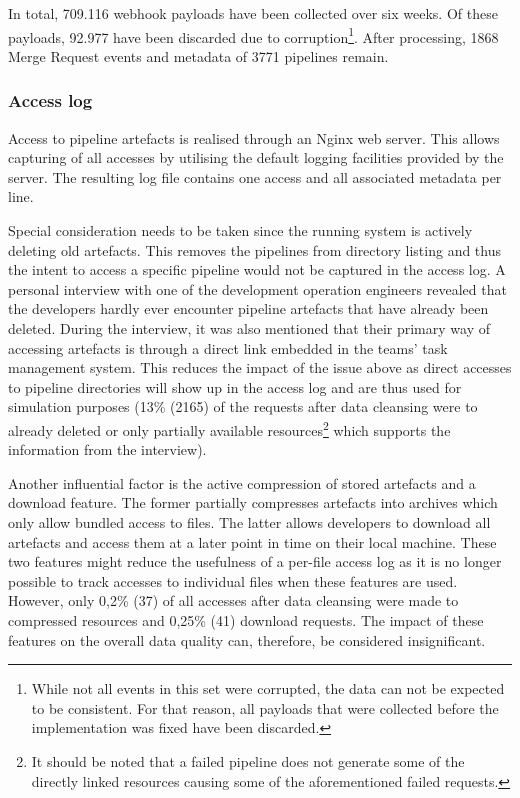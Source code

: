     In total, 709.116 webhook payloads have been collected over six weeks. Of these payloads, 92.977 have been discarded due to corruption\footnote{While not all events in this set were corrupted, the data can not be expected to be consistent. For that reason, all payloads that were collected before the implementation was fixed have been discarded.}. After processing, 1868 Merge Request events and metadata of 3771 pipelines remain.
    
\subsubsection{Access log}\label{sec:data-source-access-log}
    Access to pipeline artefacts is realised through an Nginx web server. This allows capturing of all accesses by utilising the default logging facilities provided by the server. The resulting log file contains one access and all associated metadata per line.
    
    Special consideration needs to be taken since the running system is actively deleting old artefacts. This removes the pipelines from directory listing and thus the intent to access a specific pipeline would not be captured in the access log. A personal interview with one of the development operation engineers revealed that the developers hardly ever encounter pipeline artefacts that have already been deleted. During the interview, it was also mentioned that their primary way of accessing artefacts is through a direct link embedded in the teams' task management system. This reduces the impact of the issue above as direct accesses to pipeline directories will show up in the access log and are thus used for simulation purposes (13\% (2165) of the requests after data cleansing were to already deleted or only partially available resources\footnote{It should be noted that a failed pipeline does not generate some of the directly linked resources causing some of the aforementioned failed requests.} which supports the information from the interview).
    
    Another influential factor is the active compression of stored artefacts and a download feature. The former partially compresses artefacts into archives which only allow bundled access to files. The latter allows developers to download all artefacts and access them at a later point in time on their local machine. These two features might reduce the usefulness of a per-file access log as it is no longer possible to track accesses to individual files when these features are used. However, only 0,2\% (37) of all accesses after data cleansing were made to compressed resources and 0,25\% (41) download requests. The impact of these features on the overall data quality can, therefore, be considered insignificant.
    
